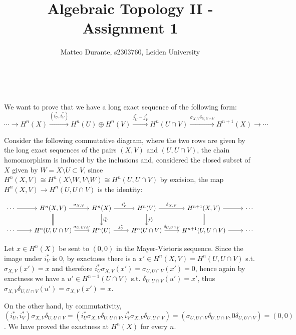 \documentclass{article}
\newcommand{\exercise}[1]{\noindent {\bf Exercise #1}}
\begin{document}
\title{Algebraic Topology II - Assignment 1}

\author{Matteo Durante, s2303760, Leiden University}

\maketitle


~\\
\exercise{4}

We want to prove that we have a long exact sequence of the following form:
$$\cdots\rightarrow H^n(X)\xrightarrow{(i^*_U,i^*_V)} H^n(U)\oplus
H^n(V)\xrightarrow{j^*_U-j^*_V} H^n(U\cap V)\xrightarrow{\sigma_{X,V}\delta_{U,U
\cap V}} H^{n+1}(X)\rightarrow\cdots$$

Consider the following commutative diagram, where the two rows are given by the long exact
sequences of the pairs $(X,V)$ and $(U,U\cap V)$, the chain homomorphism is
induced by the inclusions and, considered the closed
subset of $X$ given by $W=X\setminus U\subset V$, since $H^n(X,V)\cong
H^n(X\setminus W,V\setminus W)\cong H^n(U,U\cap V)$ by excision, the map
$H^n(X,V)\rightarrow H^n(U,U\cap V)$ is the identity:

\[
    \begin{tikzcd}
        \cdots\arrow{r}
        & H^n(X,V)\arrow{r}{\sigma_{X,V}}\arrow[equal]{d}
        & H^n(X)\arrow{r}{i^*_V}\arrow{d}{i^*_U}
        & H^n(V)\arrow{r}{\delta_{X,V}}\arrow{d}{j^*_V}
        & H^{n+1}(X,V)\arrow{r}\arrow[equal]{d}
        & \cdots \\
        \cdots\arrow{r}
        & H^n(U,U\cap V)\arrow{r}{\sigma_{U,U\cap V}}
        & H^n(U)\arrow{r}{j^*_U}
        & H^n(U\cap V)\arrow{r}{\delta_{U,U\cap V}}
        & H^{n+1}(U,U\cap V)\arrow{r}
        & \cdots
    \end{tikzcd}
\]

Let $x\in H^n(X)$ be sent to $(0,0)$ in the Mayer-Vietoris sequence. Since the
image under $i^*_V$ is 0, by exactness there is a $x'\in H^n(X,V)=H^n(U,U\cap V)$ s.t.
$\sigma_{X,V}(x')=x$ and therefore $i^*_U\sigma_{X,V}(x')=\sigma_{U,U\cap V}(x')
=0$, hence again by exactness we have a $u'\in H^{n-1}(U\cap V)$ s.t.
$\delta_{U,U\cap V}(u')=x'$, thus $\sigma_{X,V}\delta_{U,U\cap
V}(u')=\sigma_{X,V}(x')=x$. 

On the other hand, by commutativity, $(i^*_U,i^*_V)\sigma_{X,V}\delta_{U,U\cap
V}=(i^*_U\sigma_{X,V}\delta_{U,U\cap V},i^*_V\sigma_{X,V}\delta_{U,U\cap
V})=(\sigma_{U,U\cap V}\delta_{U,U\cap V},0\delta_{U,U\cap V})=(0,0)$. We have proved
the exactness at $H^n(X)$ for every $n$.
\end{document}

